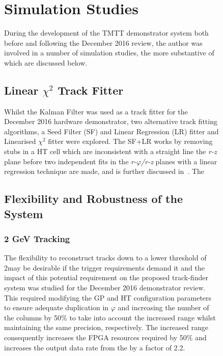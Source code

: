 \begin{figure}[tb]
\section{Simulation Studies}
During the development of the TMTT demonstrator system both before and following the December 2016 review, the author was involved in a number of simulation studies, the more substantive of which are discussed below.

\subsection{Linear $\chi^{2}$ Track Fitter}
Whilst the Kalman Filter was used as a track fitter for the December 2016 hardware demonstrator, two alternative track fitting algorithms, a Seed Filter (SF) and Linear Regression (LR) fitter and Linearised $\chi^{2}$ fitter were explored.
The SF+LR works by removing stubs in a HT cell which are inconsistent with a straight line the \emph{r-z} plane before  two independent fits in the \emph{r-$\varphi$/r-z} planes with a linear regression technique are made, and is further discussed in~\cite{TMTT_FLP}.
The 



\subsection{Flexibility and Robustness of the System}
\subsubsection{2 GeV Tracking}
The flexibility to reconstruct tracks down to a lower \pT threshold of 2\GeV may be desirable if the trigger requirements demand it and the impact of this potential requirement on the proposed track-finder system was studied for the December 2016 demonstrator review.
This required modifying the GP and HT configuration parameters to ensure adequate duplication in $\varphi$ and increasing the number of the \qpt columns by 50\% to take into account the increased \pt range whilst maintaining the same precision, respectively.
The increased \qpt range consequently increases the FPGA resources required by 50\% and increases the output data rate from the \HT by a factor of 2.2.


\end{figure}
